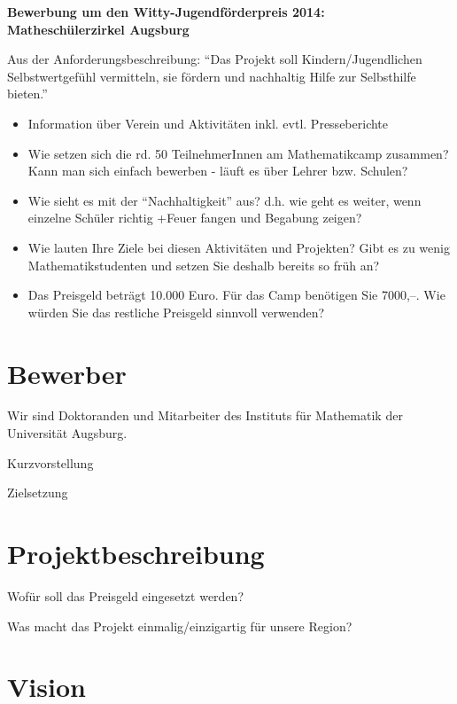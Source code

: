 \documentclass[12pt]{zettel}
\begin{document}
\renewcommand{\betreff}{}

\makeletterhead{}

\vspace{-2em}

\begin{center}
  \Large\textbf{\textsf{Bewerbung um den Witty-Jugendförderpreis 2014: \\
  Matheschülerzirkel Augsburg }}
\end{center}

Aus der Anforderungsbeschreibung: "`Das Projekt soll
Kindern/Jugendlichen Selbstwertgefühl vermitteln, sie fördern und nachhaltig
Hilfe zur Selbsthilfe bieten."'

\begin{itemize}
\item Information über Verein und Aktivitäten inkl. evtl. Presseberichte
\item Wie setzen sich die rd. 50 TeilnehmerInnen am Mathematikcamp zusammen? Kann
man sich einfach bewerben - läuft es über Lehrer bzw. Schulen?
\item Wie sieht es mit der "`Nachhaltigkeit"' aus? d.h. wie geht es weiter, wenn
einzelne Schüler richtig +Feuer fangen und Begabung zeigen?
\item Wie lauten Ihre Ziele bei diesen Aktivitäten und Projekten? Gibt es zu
wenig Mathematikstudenten und setzen Sie deshalb bereits so früh an?
\item Das Preisgeld beträgt 10.000 Euro. Für das Camp benötigen Sie 7000,--. Wie
würden Sie das restliche Preisgeld sinnvoll verwenden?
\end{itemize}

\section{Bewerber}

Wir sind Doktoranden und Mitarbeiter des Instituts für Mathematik der
Universität Augsburg.

Kurzvorstellung

Zielsetzung


\section{Projektbeschreibung}

Wofür soll das Preisgeld eingesetzt werden?

Was macht das Projekt einmalig/einzigartig für unsere Region?


\section{Vision}
\end{document}
